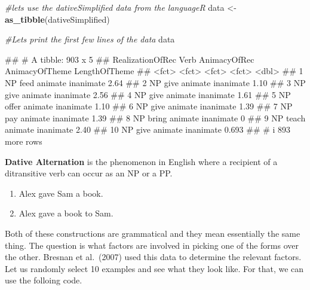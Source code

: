 \documentclass[
]{book}
\newenvironment{Shaded}{\begin{snugshade}}{\end{snugshade}}
\newcommand{\CommentTok}[1]{\textcolor[rgb]{0.56,0.35,0.01}{\textit{#1}}}
\newcommand{\FunctionTok}[1]{\textcolor[rgb]{0.13,0.29,0.53}{\textbf{#1}}}
\newcommand{\NormalTok}[1]{#1}
\newcommand{\OtherTok}[1]{\textcolor[rgb]{0.56,0.35,0.01}{#1}}
\providecommand{\tightlist}{%
  \setlength{\itemsep}{0pt}\setlength{\parskip}{0pt}}
\begin{document}
\begin{Shaded}
\begin{Highlighting}[]
\CommentTok{\#let\textquotesingle{}s use the dativeSimplified data from the languageR }
\NormalTok{data }\OtherTok{\textless{}{-}} \FunctionTok{as\_tibble}\NormalTok{(dativeSimplified)}

\CommentTok{\#Let\textquotesingle{}s print the first few lines of the data}
\NormalTok{data}
\end{Highlighting}
\end{Shaded}

\begin{Shaded}
\begin{Highlighting}[]
\NormalTok{\#\# \# A tibble: 903 x 5}
\NormalTok{\#\#    RealizationOfRec Verb  AnimacyOfRec AnimacyOfTheme LengthOfTheme}
\NormalTok{\#\#    \textless{}fct\textgreater{}            \textless{}fct\textgreater{} \textless{}fct\textgreater{}        \textless{}fct\textgreater{}                  \textless{}dbl\textgreater{}}
\NormalTok{\#\#  1 NP               feed  animate      inanimate              2.64 }
\NormalTok{\#\#  2 NP               give  animate      inanimate              1.10 }
\NormalTok{\#\#  3 NP               give  animate      inanimate              2.56 }
\NormalTok{\#\#  4 NP               give  animate      inanimate              1.61 }
\NormalTok{\#\#  5 NP               offer animate      inanimate              1.10 }
\NormalTok{\#\#  6 NP               give  animate      inanimate              1.39 }
\NormalTok{\#\#  7 NP               pay   animate      inanimate              1.39 }
\NormalTok{\#\#  8 NP               bring animate      inanimate              0    }
\NormalTok{\#\#  9 NP               teach animate      inanimate              2.40 }
\NormalTok{\#\# 10 NP               give  animate      inanimate              0.693}
\NormalTok{\#\# \# i 893 more rows}
\end{Highlighting}
\end{Shaded}

\textbf{Dative Alternation} is the phenomenon in English where a recipient of a ditransitive verb can occur as an NP or a PP.

\begin{enumerate}
\def\labelenumi{\arabic{enumi}.}
\tightlist
\item
  Alex gave Sam a book.
\item
  Alex gave a book to Sam.
\end{enumerate}

Both of these constructions are grammatical and they mean essentially the same thing. The question is what factors are involved in picking one of the forms over the other. Bresnan et al.~(2007) used this data to determine the relevant factors.
Let us randomly select 10 examples and see what they look like. For that, we can use the folloing code.
\end{document}
